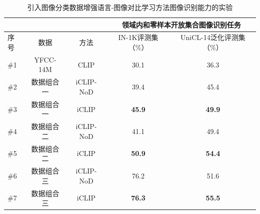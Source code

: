 \begin{table}
    \centering
    \caption{引入图像分类数据增强语言-图像对比学习方法图像识别能力的实验}
    \begin{tabular}{lcccc}
    \toprule
        \multicolumn{1}{c}{} &
        \multicolumn{1}{c}{} & \multicolumn{1}{c}{} & \multicolumn{2}{c}{领域内和零样本开放集合图像识别任务} \\
        \midrule
        序号 & 数据 & 方法 & IN-1K评测集（\%） & UniCL-14泛化评测集（\%）  \\
        \midrule
        \#1 & YFCC-14M & CLIP & 30.1 & 36.3 \\

        \#2 & 数据组合一 & iCLIP-NoD & 39.4 & 45.4 \\  
                
        \#3 & 数据组合一 & iCLIP & \textbf{45.9} & \textbf{49.9} \\    
        
        \midrule
        
        \#4 & 数据组合二 & iCLIP-NoD & 41.1 & 49.4  \\  
                
        \#5 & 数据组合二 & iCLIP & \textbf{50.9} & \textbf{54.4} \\   
        
        \midrule        
        
        \#6 & 数据组合三 & iCLIP-NoD & 76.2 & 51.6 \\
        
        \#7 & 数据组合三 & iCLIP & \textbf{76.3} & \textbf{55.5} \\

        \bottomrule
    \end{tabular}
    \label{tab:iclip-ablate_yfcc}
\end{table}
